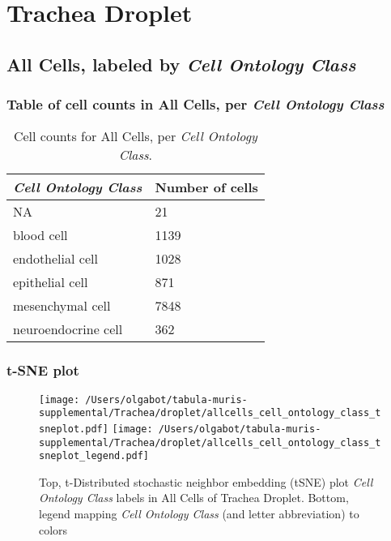 \clearpage
\section{Trachea Droplet}

\subsection{All Cells, labeled by \emph{Cell Ontology Class}}
\subsubsection{Table of cell counts in All Cells, per \emph{Cell Ontology Class}}\begin{table}[h]
\centering
\label{my-label}
\begin{tabular}{@{}ll@{}}
\toprule

\emph{Cell Ontology Class}& Number of cells \\ \midrule
NA & 21 \\

blood cell & 1139 \\

endothelial cell & 1028 \\

epithelial cell & 871 \\

mesenchymal cell & 7848 \\

neuroendocrine cell & 362 \\
\bottomrule
\end{tabular}
\caption{Cell counts for All Cells, per \emph{Cell Ontology Class}.}
\end{table}

\clearpage
\subsubsection{t-SNE plot}
\begin{figure}[h]
\centering
\texttt{[image: /Users/olgabot/tabula-muris-supplemental/Trachea/droplet/allcells\_cell\_ontology\_class\_tsneplot.pdf]}
\texttt{[image: /Users/olgabot/tabula-muris-supplemental/Trachea/droplet/allcells\_cell\_ontology\_class\_tsneplot\_legend.pdf]}
\caption{Top, t-Distributed stochastic neighbor embedding (tSNE) plot  \emph{Cell Ontology Class} labels in All Cells of Trachea Droplet. Bottom, legend mapping \emph{Cell Ontology Class} (and letter abbreviation) to colors}
\end{figure}


